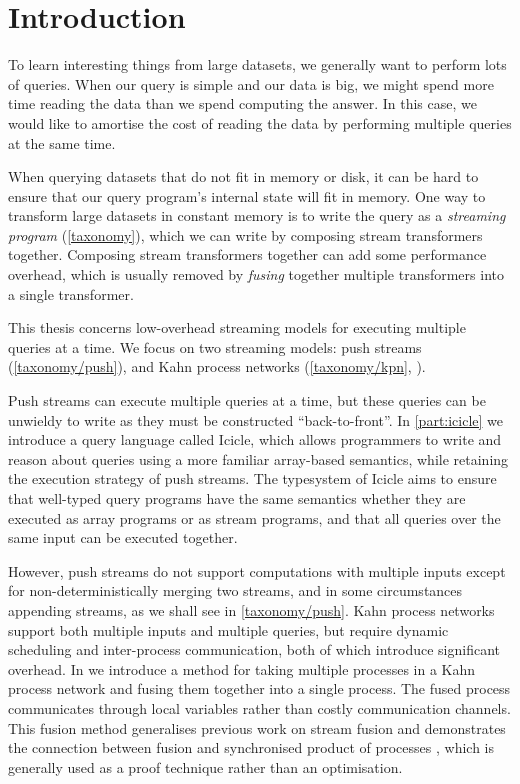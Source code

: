 \chapter{Introduction}
\label{introduction}
To learn interesting things from large datasets, we generally want to perform lots of queries.
When our query is simple and our data is big, we might spend more time reading the data than we spend computing the answer.
In this case, we would like to amortise the cost of reading the data by performing multiple queries at the same time.

When querying datasets that do not fit in memory or disk, it can be hard to ensure that our query program's internal state will fit in memory.
One way to transform large datasets in constant memory is to write the query as a \emph{streaming program} (\autoref{taxonomy}), which we can write by composing stream transformers together.
Composing stream transformers together can add some performance overhead, which is usually removed by \emph{fusing} together multiple transformers into a single transformer.

This thesis concerns low-overhead streaming models for executing multiple queries at a time.
We focus on two streaming models: push streams (\autoref{taxonomy/push}), and Kahn process networks (\autoref{taxonomy/kpn}, ).

Push streams can execute multiple queries at a time, but these queries can be unwieldy to write as they must be constructed ``back-to-front''.
In \autoref{part:icicle} we introduce a query language called Icicle, which allows programmers to write and reason about queries using a more familiar array-based semantics, while retaining the execution strategy of push streams.
The typesystem of Icicle aims to ensure that well-typed query programs have the same semantics whether they are executed as array programs or as stream programs, and that all queries over the same input can be executed together.

However, push streams do not support computations with multiple inputs except for non-deterministically merging two streams, and in some circumstances appending streams, as we shall see in \autoref{taxonomy/push}.
Kahn process networks support both multiple inputs and multiple queries, but require dynamic scheduling and inter-process communication, both of which introduce significant overhead.
In  we introduce a method for taking multiple processes in a Kahn process network and fusing them together into a single process.
The fused process communicates through local variables rather than costly communication channels.
This fusion method generalises previous work on stream fusion  and demonstrates the connection between fusion and synchronised product of processes , which is generally used as a proof technique rather than an optimisation.

